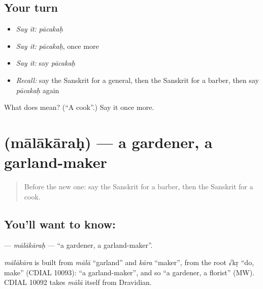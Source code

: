 \subsection*{Your turn}
\begin{itemize}
\raggedright
  \item \emph{Say it:} \emph{pācakaḥ}
  \item \emph{Say it:} \emph{pācakaḥ}, once more
  \item \emph{Say it:} say \emph{pācakaḥ}
  \item \emph{Recall:} say the Sanskrit for a general, then the Sanskrit for a barber, then say \emph{pācakaḥ} again
\end{itemize}

\begin{tcolorbox}[breakable,colback=teal!4,colframe=teal!35!black,title={Before you move on}]
What does  mean? (\textquotedblleft{}A cook\textquotedblright{}.) Say it once more.
\end{tcolorbox}
\section[\texorpdfstring{\sk{मालाकारः} (mālākāraḥ)}{मालाकारः (mālākāraḥ)}]{ (mālākāraḥ) — a gardener, a garland-maker}

\label{lesson:SA-C148-malakarah}



\begin{quote}
Before the new one: say the Sanskrit for a barber, then the Sanskrit for a cook.
\end{quote}

\subsection*{You'll want to know: }
\textbf{} — \emph{mālākāraḥ} — \textquotedblleft{}a gardener, a garland-maker\textquotedblright{}.

\begin{cousinweb}
\emph{mālākāra} is built from \emph{mālā} \textquotedblleft{}garland\textquotedblright{} and \emph{kāra} \textquotedblleft{}maker\textquotedblright{}, from the root √kṛ \textquotedblleft{}do, make\textquotedblright{} (CDIAL 10093): \textquotedblleft{}a garland-maker\textquotedblright{}, and so \textquotedblleft{}a gardener, a florist\textquotedblright{} (MW). CDIAL 10092 takes \emph{mālā} itself from Dravidian.
\end{cousinweb}

